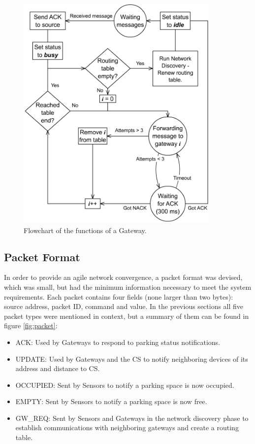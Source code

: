 \begin{figure}
    \centering
    \includegraphics[width=10cm]{images/Flowchart_Gateway.png}
	\vspace{-1.5em}
    \caption{Flowchart of the functions of a Gateway.}
    \vspace{-1.5em}
    \label{fig:gateway}
\end{figure}

\subsection{Packet Format}
\label{sec:packet_format}
In order to provide an agile network convergence, a packet format was devised, which was small, but had the minimum information necessary to meet the system requirements.
Each packet contains four fields (none larger than two bytes): source address, packet ID, command and value.
In the previous sections all five packet types were mentioned in context, but a summary of them can be found in figure \ref{fig:packet}:
\begin{itemize}[noitemsep]
	\item ACK: Used by Gateways to respond to parking status notifications. 
	\item UPDATE: Used by Gateways and the CS to notify neighboring devices of its address and distance to CS.
	\item OCCUPIED: Sent by Sensors to notify a parking space is now occupied.
	\item EMPTY: Sent by Sensors to notify a parking space is now free.
	\item GW\_REQ: Sent by Sensors and Gateways in the network discovery phase to establish communications with neighboring gateways and create a routing table.
\end{itemize}

